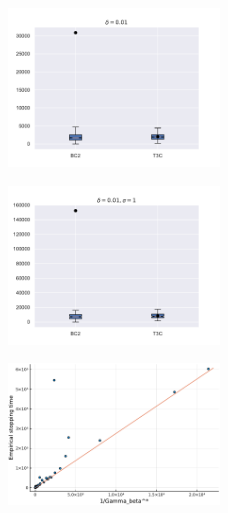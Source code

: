 \renewcommand\thefigure{\arabic{figure}}
\setcounter{figure}{0}

\newpage
\begin{figure}
    \centering
    \includegraphics[width=0.5\textwidth]{img/bc2_beta.pdf}
    \caption{}
    \label{fig:bc21}
\end{figure}

\begin{figure}
    \centering
    \includegraphics[width=0.5\textwidth]{img/bc2_gaussian.pdf}
    \caption{}
    \label{fig:bc22}
\end{figure}

\begin{figure}
    \centering
    \includegraphics[width=0.5\textwidth]{img/hardness.pdf}
    \caption{}
    \label{fig:hardness}
\end{figure}
